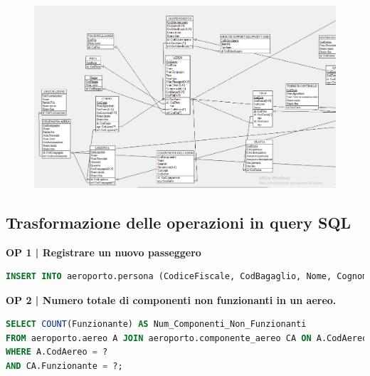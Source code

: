 \begin{figure}
	\includegraphics[width=1.2\textwidth]{./img/Schema_Logico/Schema_Logico2.png}
	\label{fig:logico2}
\end{figure}

\restoregeometry


\newpage

\subsection{Trasformazione delle operazioni in query SQL}


\textbf{\small OP 1 | Registrare un nuovo passeggero}

	
\begin{lstlisting}[language=SQL]
INSERT INTO aeroporto.persona (CodiceFiscale, CodBagaglio, Nome, Cognome, Età, CodVolo) VALUES(?, ?, ?, ?, ?, ?); 
\end{lstlisting} %


\textbf{\small OP 2 | Numero totale di componenti non funzionanti in un aereo.}\\

\begin{lstlisting}[language=SQL]
SELECT COUNT(Funzionante) AS Num_Componenti_Non_Funzionanti
FROM aeroporto.aereo A JOIN aeroporto.componente_aereo CA ON A.CodAereo = CA.CodAereo
WHERE A.CodAereo = ?
AND CA.Funzionante = ?;
\end{lstlisting}

